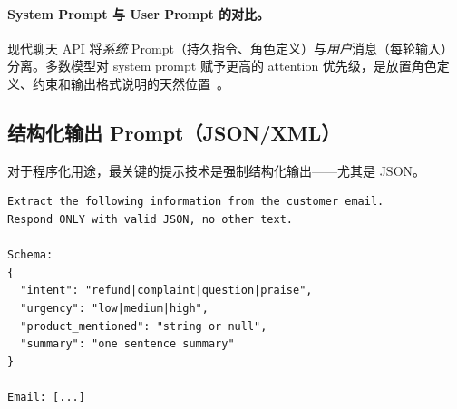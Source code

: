 \paragraph{System Prompt 与 User Prompt 的对比。}
\label{system-prompts-vs.-user-prompts.}

现代聊天 API 将\emph{系统} Prompt（持久指令、角色定义）与\emph{用户}消息（每轮输入）分离。多数模型对 system prompt 赋予更高的 attention 优先级，是放置角色定义、约束和输出格式说明的天然位置~\cite{openai2023gpt4}。

\subsection{结构化输出 Prompt（JSON/XML）}
\label{structured-output-prompts-jsonxml}

对于程序化用途，最关键的提示技术是强制结构化输出——尤其是 JSON。

\begin{examplebox}
\begin{lstlisting}
Extract the following information from the customer email.
Respond ONLY with valid JSON, no other text.

Schema:
{
  "intent": "refund|complaint|question|praise",
  "urgency": "low|medium|high",
  "product_mentioned": "string or null",
  "summary": "one sentence summary"
}

Email: [...]
\end{lstlisting}
\end{examplebox}

